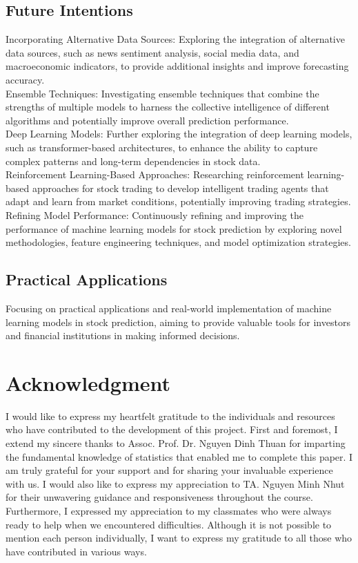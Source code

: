 \documentclass{ieeeojies}
\begin{document}
\subsection{Future Intentions}
Incorporating Alternative Data Sources: Exploring the integration of alternative data sources, such as news sentiment analysis, social media data, and macroeconomic indicators, to provide additional insights and improve forecasting accuracy.\\
Ensemble Techniques: Investigating ensemble techniques that combine the strengths of multiple models to harness the collective intelligence of different algorithms and potentially improve overall prediction performance.\\
Deep Learning Models: Further exploring the integration of deep learning models, such as transformer-based architectures, to enhance the ability to capture complex patterns and long-term dependencies in stock data.\\
Reinforcement Learning-Based Approaches: Researching reinforcement learning-based approaches for stock trading to develop intelligent trading agents that adapt and learn from market conditions, potentially improving trading strategies.\\
Refining Model Performance: Continuously refining and improving the performance of machine learning models for stock prediction by exploring novel methodologies, feature engineering techniques, and model optimization strategies.

\subsection{Practical Applications}
Focusing on practical applications and real-world implementation of machine learning models in stock prediction, aiming to provide valuable tools for investors and financial institutions in making informed decisions.

\section*{Acknowledgment}
I would like to express my heartfelt gratitude to the individuals and resources who have contributed to the development of this project. First and foremost, I extend my sincere thanks to Assoc. Prof. Dr. Nguyen Dinh Thuan for imparting the fundamental knowledge of statistics that enabled me to complete this paper. I am truly grateful for your support and for sharing your invaluable experience with us. I would also like to express my appreciation to TA. Nguyen Minh Nhut for their unwavering guidance and responsiveness throughout the course. Furthermore, I expressed my appreciation to my classmates who were always ready to help when we encountered difficulties. Although it is not possible to mention each person individually, I want to express my gratitude to all those who have contributed in various ways. 
\end{document}

